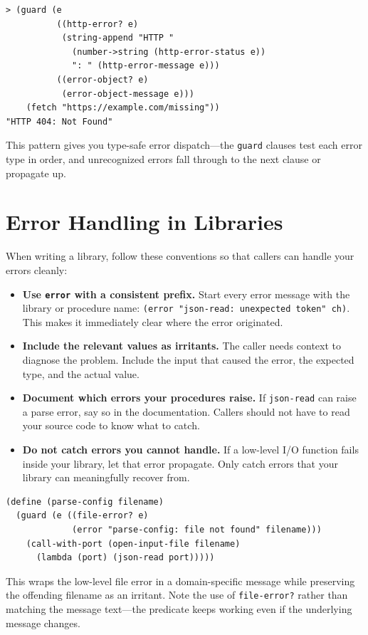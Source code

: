 \begin{lstlisting}[style=repl]
> (guard (e
          ((http-error? e)
           (string-append "HTTP "
             (number->string (http-error-status e))
             ": " (http-error-message e)))
          ((error-object? e)
           (error-object-message e)))
    (fetch "https://example.com/missing"))
"HTTP 404: Not Found"
\end{lstlisting}

This pattern gives you type-safe error dispatch---the \texttt{guard} clauses test each error type in order, and unrecognized errors fall through to the next clause or propagate up.

\section{Error Handling in Libraries}

When writing a library, follow these conventions so that callers can handle your errors cleanly:

\begin{itemize}
    \item \textbf{Use \texttt{error} with a consistent prefix.} Start every error message with the library or procedure name: \texttt{(error "json-read: unexpected token" ch)}. This makes it immediately clear where the error originated.
    \item \textbf{Include the relevant values as irritants.} The caller needs context to diagnose the problem. Include the input that caused the error, the expected type, and the actual value.
    \item \textbf{Document which errors your procedures raise.} If \texttt{json-read} can raise a parse error, say so in the documentation. Callers should not have to read your source code to know what to catch.
    \item \textbf{Do not catch errors you cannot handle.} If a low-level I/O function fails inside your library, let that error propagate. Only catch errors that your library can meaningfully recover from.
\end{itemize}

\begin{lstlisting}
(define (parse-config filename)
  (guard (e ((file-error? e)
             (error "parse-config: file not found" filename)))
    (call-with-port (open-input-file filename)
      (lambda (port) (json-read port)))))
\end{lstlisting}

This wraps the low-level file error in a domain-specific message while preserving the offending filename as an irritant. Note the use of \texttt{file-error?} rather than matching the message text---the predicate keeps working even if the underlying message changes.

